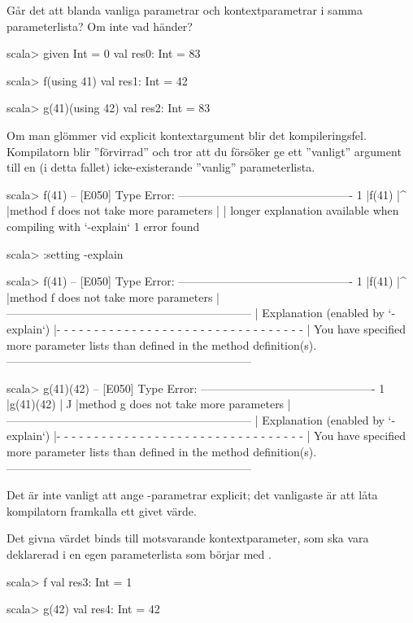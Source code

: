 \Subtask Går det att blanda vanliga parametrar och kontextparametrar i samma parameterlista? Om inte vad händer?

\SOLUTION

\TaskSolved \what

\SubtaskSolved
\begin{REPLnonum}
scala> given Int = 0
val res0: Int = 83

scala> f(using 41)
val res1: Int = 42

scala> g(41)(using 42)
val res2: Int = 83
\end{REPLnonum}
\noindent 
Om man glömmer  vid explicit kontextargument blir det kompileringsfel. Kompilatorn blir ''förvirrad'' och tror att du försöker ge ett ''vanligt'' argument till en (i detta fallet) icke-existerande ''vanlig'' parameterlista.  
\begin{REPLnonum}
scala> f(41)
-- [E050] Type Error: ----------------------------------------------
1 |f(41)
  |^
  |method f does not take more parameters
  |
  | longer explanation available when compiling with `-explain`
1 error found

scala> :setting -explain

scala> f(41)
-- [E050] Type Error: ----------------------------------------------
1 |f(41)
  |^
  |method f does not take more parameters
  |-----------------------------------------------------------------
    | Explanation (enabled by `-explain`)
  |- - - - - - - - - - - - - - - - - - - - - - - - - - - - - - - - -
  | You have specified more parameter lists than defined in the 
    method definition(s).
   -----------------------------------------------------------------

scala> g(41)(42)
-- [E050] Type Error: ----------------------------------------------
1 |g(41)(42)
  |^^^^^
  |method g does not take more parameters
  |-----------------------------------------------------------------
    | Explanation (enabled by `-explain`)
  |- - - - - - - - - - - - - - - - - - - - - - - - - - - - - - - - -
  | You have specified more parameter lists than defined in the 
    method definition(s).
   -----------------------------------------------------------------
\end{REPLnonum}
Det är inte vanligt att ange -parametrar explicit; det vanligaste är att låta kompilatorn framkalla ett givet värde.

\SubtaskSolved Det givna värdet  binds till motsvarande kontextparameter, som ska vara deklarerad i en egen parameterlista som börjar med .
\begin{REPLnonum}
scala> f
val res3: Int = 1

scala> g(42)
val res4: Int = 42
\end{REPLnonum}

